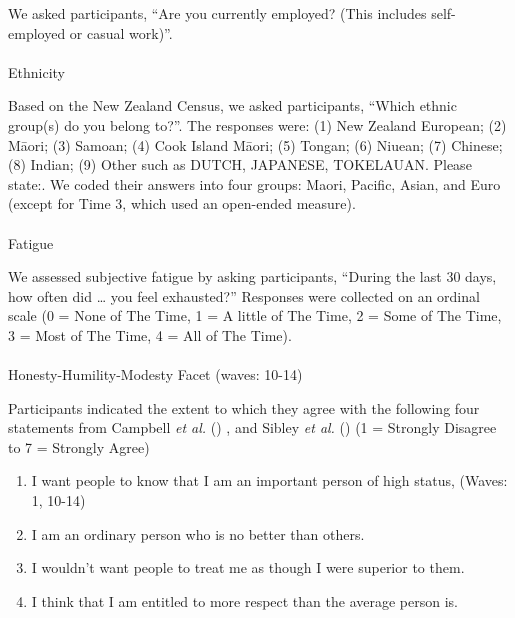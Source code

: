 \documentclass[
  single column]{article}
\makeatletter
\let\oldparagraph\paragraph
\renewcommand{\paragraph}{
    \@ifstar
      \xxxParagraphStar
      \xxxParagraphNoStar
  }
\newcommand{\xxxParagraphStar}[1]{\oldparagraph*{#1}\mbox{}}
\newcommand{\xxxParagraphNoStar}[1]{\oldparagraph{#1}\mbox{}}
\providecommand{\tightlist}{%
  \setlength{\itemsep}{0pt}\setlength{\parskip}{0pt}}\usepackage{longtable,booktabs,array}
\makeatother
\begin{document}
We asked participants, ``Are you currently employed? (This includes
self-employed or casual work)''.

\paragraph{Ethnicity}\label{ethnicity}

Based on the New Zealand Census, we asked participants, ``Which ethnic
group(s) do you belong to?''. The responses were: (1) New Zealand
European; (2) Māori; (3) Samoan; (4) Cook Island Māori; (5) Tongan; (6)
Niuean; (7) Chinese; (8) Indian; (9) Other such as DUTCH, JAPANESE,
TOKELAUAN. Please state:. We coded their answers into four groups:
Maori, Pacific, Asian, and Euro (except for Time 3, which used an
open-ended measure).

\paragraph{Fatigue}\label{fatigue}

We assessed subjective fatigue by asking participants, ``During the last
30 days, how often did \ldots{} you feel exhausted?'' Responses were
collected on an ordinal scale (0 = None of The Time, 1 = A little of The
Time, 2 = Some of The Time, 3 = Most of The Time, 4 = All of The Time).

\paragraph{Honesty-Humility-Modesty Facet (waves:
10-14)}\label{honesty-humility-modesty-facet-waves-10-14}

Participants indicated the extent to which they agree with the following
four statements from Campbell \emph{et al.}
() , and Sibley \emph{et al.}
() (1 = Strongly Disagree to 7 = Strongly
Agree)

\begin{enumerate}
\def\labelenumi{\roman{enumi}.}
\tightlist
\item
  I want people to know that I am an important person of high status,
  (Waves: 1, 10-14)
\item
  I am an ordinary person who is no better than others.
\item
  I wouldn't want people to treat me as though I were superior to them.
\item
  I think that I am entitled to more respect than the average person is.
\end{enumerate}
\end{document}
